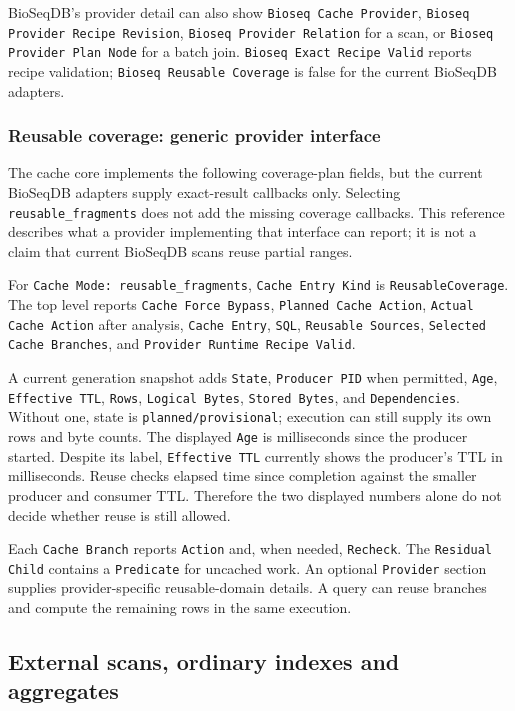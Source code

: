 BioSeqDB's provider detail can also show \texttt{Bioseq Cache Provider},
\texttt{Bioseq Provider Recipe Revision}, \texttt{Bioseq Provider Relation}
for a scan, or \texttt{Bioseq Provider Plan Node} for a batch join.
\texttt{Bioseq Exact Recipe Valid} reports recipe validation;
\texttt{Bioseq Reusable Coverage} is false for the current BioSeqDB adapters.

\subsubsection{Reusable coverage: generic provider interface}

The cache core implements the following coverage-plan fields, but the current
BioSeqDB adapters supply exact-result callbacks only. Selecting
\texttt{reusable\_fragments} does not add the missing coverage callbacks.
This reference describes what a provider implementing that interface can
report; it is not a claim that current BioSeqDB scans reuse partial ranges.

For \texttt{Cache Mode: reusable\_fragments},
\texttt{Cache Entry Kind} is \texttt{ReusableCoverage}. The top level reports
\texttt{Cache Force Bypass}, \texttt{Planned Cache Action},
\texttt{Actual Cache Action} after analysis, \texttt{Cache Entry},
\texttt{SQL}, \texttt{Reusable Sources}, \texttt{Selected Cache Branches},
and \texttt{Provider Runtime Recipe Valid}.

A current generation snapshot adds \texttt{State}, \texttt{Producer PID}
when permitted, \texttt{Age}, \texttt{Effective TTL}, \texttt{Rows},
\texttt{Logical Bytes}, \texttt{Stored Bytes}, and \texttt{Dependencies}.
Without one, state is \texttt{planned/provisional}; execution can still supply
its own rows and byte counts. The displayed \texttt{Age} is milliseconds
since the producer started. Despite its label, \texttt{Effective TTL}
currently shows the producer's TTL in milliseconds. Reuse checks elapsed time
since completion against the smaller producer and consumer TTL. Therefore the
two displayed numbers alone do not decide whether reuse is still allowed.

Each \texttt{Cache Branch} reports \texttt{Action} and, when needed,
\texttt{Recheck}. The \texttt{Residual Child} contains a \texttt{Predicate}
for uncached work. An optional \texttt{Provider} section supplies
provider-specific reusable-domain details. A query can reuse branches and
compute the remaining rows in the same execution.

\subsection{External scans, ordinary indexes and aggregates}

